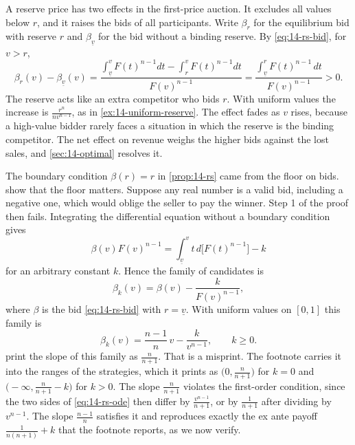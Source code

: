 A reserve price has two effects in the first-price auction. It excludes all values below $r$, and it raises the bids of all participants. Write $\beta_r$ for the equilibrium bid with reserve $r$ and $\beta_{\underline v}$ for the bid without a binding reserve. By \eqref{eq:14-rs-bid}, for $v>r$,
\[
\beta_r(v)-\beta_{\underline v}(v)=\frac{\int_{\underline v}^v F(t)^{n-1}dt-\int_r^v F(t)^{n-1}dt}{F(v)^{n-1}}=\frac{\int_{\underline v}^r F(t)^{n-1}\,dt}{F(v)^{n-1}}>0.
\]
The reserve acts like an extra competitor who bids $r$. With uniform values the increase is $\frac{r^n}{nv^{n-1}}$, as in \cref{ex:14-uniform-reserve}. The effect fades as $v$ rises, because a high-value bidder rarely faces a situation in which the reserve is the binding competitor. The net effect on revenue weighs the higher bids against the lost sales, and \cref{sec:14-optimal} resolves it.

The boundary condition $\beta(r)=r$ in \cref{prop:14-rs} came from the floor on bids.  show that the floor matters. Suppose any real number is a valid bid, including a negative one, which would oblige the seller to pay the winner. Step 1 of the proof then fails. Integrating the differential equation without a boundary condition gives
\[
\beta(v)F(v)^{n-1}=\int_{\underline v}^v t\,d\big[F(t)^{n-1}\big]-k
\]
for an arbitrary constant $k$. Hence the family of candidates is
\begin{equation}\label{eq:14-multiplicity}
\beta_k(v)=\beta(v)-\frac{k}{F(v)^{n-1}},
\end{equation}
where $\beta$ is the bid \eqref{eq:14-rs-bid} with $r=\underline v$. With uniform values on $[0,1]$ this family is
\[
\beta_k(v)=\frac{n-1}{n}\,v-\frac{k}{v^{n-1}},\qquad k\ge 0.
\]
 print the slope of this family as $\frac{n}{n+1}$. That is a misprint. The footnote carries it into the ranges of the strategies, which it prints as $\big(0,\frac{n}{n+1}\big)$ for $k=0$ and $\big(-\infty,\frac{n}{n+1}-k\big)$ for $k>0$. The slope $\frac{n}{n+1}$ violates the first-order condition, since the two sides of \eqref{eq:14-rs-ode} then differ by $\frac{v^{n-1}}{n+1}$, or by $\frac{1}{n+1}$ after dividing by $v^{n-1}$. The slope $\frac{n-1}{n}$ satisfies it and reproduces exactly the ex ante payoff $\frac{1}{n(n+1)}+k$ that the footnote reports, as we now verify.


